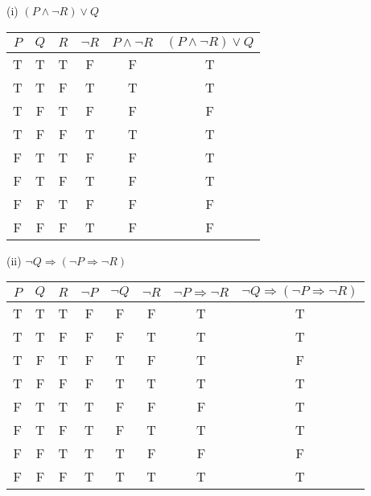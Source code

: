 \documentclass{article}
\begin{document}
(i) $(P \land \neg R) \lor Q$\\
\begin{tabular}{|c|c|c|c|c|c|}
    \hline
    $P$ & $Q$ & $R$ & $\neg R$ & $ P \land \neg R$ & $(P \land \neg R) \lor Q$ \\
    \hline
    T   & T   & T   & F        & F                 & T                         \\
    T   & T   & F   & T        & T                 & T                         \\
    T   & F   & T   & F        & F                 & F                         \\
    T   & F   & F   & T        & T                 & T                         \\
    F   & T   & T   & F        & F                 & T                         \\
    F   & T   & F   & T        & F                 & T                         \\
    F   & F   & T   & F        & F                 & F                         \\
    F   & F   & F   & T        & F                 & F                         \\
    \hline
\end{tabular}

(ii) $\neg Q \Rightarrow (\neg P \Rightarrow \neg R)$\\
\begin{tabular}{|c|c|c|c|c|c|c|c|}
    \hline
    $P$ & $Q$ & $R$ & $\neg P $ & $\neg Q$ & $\neg R$ & $\neg P \Rightarrow \neg R $ & $\neg Q \Rightarrow (\neg P \Rightarrow \neg R)$ \\
    \hline
    T   & T   & T   & F         & F        & F        & T                            & T                                                \\
    T   & T   & F   & F         & F        & T        & T                            & T                                                \\
    T   & F   & T   & F         & T        & F        & T                            & F                                                \\
    T   & F   & F   & F         & T        & T        & T                            & T                                                \\
    F   & T   & T   & T         & F        & F        & F                            & T                                                \\
    F   & T   & F   & T         & F        & T        & T                            & T                                                \\
    F   & F   & T   & T         & T        & F        & F                            & F                                                \\
    F   & F   & F   & T         & T        & T        & T                            & T                                                \\
    \hline
\end{tabular}
\end{document}
